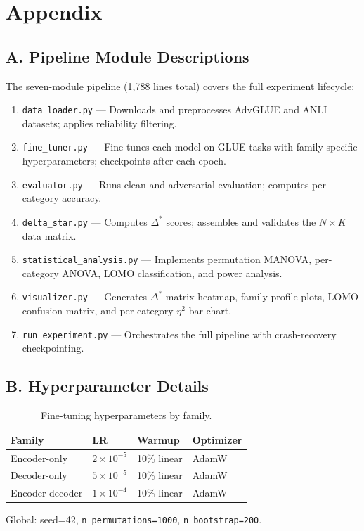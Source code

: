 \section*{Appendix}

\subsection*{A. Pipeline Module Descriptions}

The seven-module pipeline (1,788 lines total) covers the full experiment lifecycle:

\begin{enumerate}
\item \texttt{data\_loader.py} --- Downloads and preprocesses AdvGLUE and ANLI datasets; applies
  reliability filtering.
\item \texttt{fine\_tuner.py} --- Fine-tunes each model on GLUE tasks with family-specific
  hyperparameters; checkpoints after each epoch.
\item \texttt{evaluator.py} --- Runs clean and adversarial evaluation; computes per-category
  accuracy.
\item \texttt{delta\_star.py} --- Computes $\Delta^*$ scores; assembles and validates the
  $N \times K$ data matrix.
\item \texttt{statistical\_analysis.py} --- Implements permutation MANOVA, per-category ANOVA,
  LOMO classification, and power analysis.
\item \texttt{visualizer.py} --- Generates $\Delta^*$-matrix heatmap, family profile plots,
  LOMO confusion matrix, and per-category $\eta^2$ bar chart.
\item \texttt{run\_experiment.py} --- Orchestrates the full pipeline with crash-recovery
  checkpointing.
\end{enumerate}

\subsection*{B. Hyperparameter Details}

\begin{table}[h]
\centering
\caption{Fine-tuning hyperparameters by family.}
\begin{tabular}{llll}
\toprule
\textbf{Family} & \textbf{LR} & \textbf{Warmup} & \textbf{Optimizer} \\
\midrule
Encoder-only    & $2 \times 10^{-5}$ & 10\% linear & AdamW \\
Decoder-only    & $5 \times 10^{-5}$ & 10\% linear & AdamW \\
Encoder-decoder & $1 \times 10^{-4}$ & 10\% linear & AdamW \\
\bottomrule
\end{tabular}
\end{table}

Global: seed=42, \texttt{n\_permutations=1000}, \texttt{n\_bootstrap=200}.
